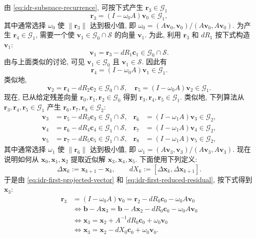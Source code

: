 {由 \eqref{eq:idr-subspace-recurrence}, 可按下式产生 $\bm r_3\in\mathcal G_1$}
\begin{equation}\label{eq:idr-first-reduced-residual}\bm r_3=(I-\omega_0A)\bm v_0\in\mathcal G_1,\end{equation}
{其中通常选择 $\omega_0$ 使 $\|\bm r_3\|$ 达到极小值, 即 $\omega_0=(A\bm v_0,\bm v_0)/(A\bm v_0,A\bm v_0)$.}
{为产生 $\bm r_4\in\mathcal G_1$, 需要一个使 $\bm v_1\in\mathcal G_0\cap\mathcal S$ 的向量 $\bm v_1$. 为此, 利用 $\bm r_3$ 和 $dR_1$ 按下式构造 $\bm v_1$:}
\[\bm v_1=\bm r_3-dR_1\bm c_1\in\mathcal G_0\cap\mathcal S.\]
{由与上面类似的讨论, 可见 $\bm v_1\in\mathcal G_0$ 且 $\bm v_1\in\mathcal S$. 因此有}
\[\bm r_4=(I-\omega_0A)\bm v_1\in\mathcal G_1.\]
{类似地,}
\[\bm v_2=\bm r_4-dR_2\bm c_2\in\mathcal G_0\cap\mathcal S,\quad\bm r_5=(I-\omega_0A)\bm v_2\in\mathcal G_1.\]
{现在, 已从给定残差向量 $\bm r_0,\bm r_1,\bm r_2\in\mathcal G_0$ 得到 $\bm r_3,\bm r_4,\bm r_5\in\mathcal G_1$. 类似地, 下列算法从 $\bm r_3,\bm r_4,\bm r_5\in\mathcal G_1$ 产生 $\bm r_6,\bm r_7,\bm r_8\in\mathcal G_2$:}
\[\begin{aligned}\bm v_3&=\bm r_5-dR_3\bm c_3\in\mathcal G_1\cap\mathcal S,&\bm r_6&=(I-\omega_1A)\bm v_3\in\mathcal G_2,\\\bm v_4&=\bm r_6-dR_4\bm c_4\in\mathcal G_1\cap\mathcal S,&\bm r_7&=(I-\omega_1A)\bm v_4\in\mathcal G_2,\\\bm v_5&=\bm r_7-dR_5\bm c_5\in\mathcal G_1\cap\mathcal S,&\bm r_8&=(I-\omega_1A)\bm v_5\in\mathcal G_2,\end{aligned}\]
{其中通常选择 $\omega_1$ 使 $\|\bm r_6\|$ 达到极小值, 即 $\omega_1=(A\bm v_3,\bm v_3)/(A\bm v_3,A\bm v_3)$.}
{现在说明如何从 $\bm x_0,\bm x_1,\bm x_2$ 提取近似解 $\bm x_3,\bm x_4,\bm x_5$. 下面使用下列定义:}
\[\Delta\bm x_k:=\bm x_{k+1}-\bm x_k,\qquad dX_k:=[\Delta\bm x_k,\Delta\bm x_{k+1}].\]
{于是由 \eqref{eq:idr-first-projected-vector} 和 \eqref{eq:idr-first-reduced-residual}, 按下式得到 $\bm x_3$:}
\[\begin{aligned}\bm r_3&=(I-\omega_0A)\bm v_0=\bm r_2-dR_0\bm c_0-\omega_0A\bm v_0\\&\Leftrightarrow\bm b-A\bm x_3=\bm b-A\bm x_2-dR_0\bm c_0-\omega_0A\bm v_0\\&\Leftrightarrow\bm x_3=\bm x_2+A^{-1}dR_0\bm c_0+\omega_0\bm v_0\\&\Leftrightarrow\bm x_3=\bm x_2-dX_0\bm c_0+\omega_0\bm v_0.\end{aligned}\]
